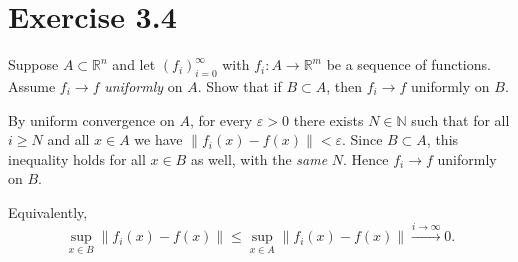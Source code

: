 \section*{Exercise 3.4}
Suppose $A\subset\mathbb{R}^n$ and let $(f_i)_{i=0}^\infty$ with $f_i:A\to\mathbb{R}^m$ be a sequence of functions.
Assume $f_i\to f$ \emph{uniformly} on $A$. Show that if $B\subset A$, then $f_i\to f$ uniformly on $B$.

\begin{solution}By uniform convergence on $A$, for every $\varepsilon>0$ there exists $N\in\mathbb{N}$ such that
for all $i\ge N$ and all $x\in A$ we have $\|f_i(x)-f(x)\|<\varepsilon$. Since $B\subset A$, this inequality holds
for all $x\in B$ as well, with the \emph{same} $N$. Hence $f_i\to f$ uniformly on $B$. \end{solution}\medskip Equivalently,
\[
\sup_{x\in B}\|f_i(x)-f(x)\|\le \sup_{x\in A}\|f_i(x)-f(x)\|\xrightarrow{i\to\infty} 0.
\]
